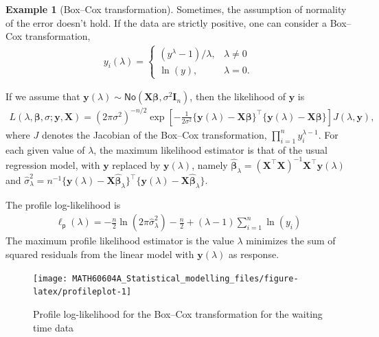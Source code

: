 \documentclass[
  11pt,
  letterpaper,
]{book}
\theoremstyle{definition}
\theoremstyle{definition}
\newtheorem{example}{Example}[chapter]
\theoremstyle{definition}
\theoremstyle{remark}
\begin{document}
\begin{example}[Box--Cox transformation]
\protect\hypertarget{exm:boxcox}{}{\label{exm:boxcox} {} }Sometimes, the assumption of normality of the error doesn't hold. If the data are strictly positive, one can consider a Box--Cox transformation,
\begin{align*}
y_i(\lambda)= \begin{cases}
(y^{\lambda}-1)/\lambda, & \lambda \neq 0\\
\ln(y), & \lambda=0.
\end{cases}
\end{align*}

If we assume that \(\boldsymbol{y}(\lambda) \sim \mathsf{No}(\mathbf{X}\boldsymbol{\beta}, \sigma^2 \mathbf{I}_n)\), then the likelihood of \(\boldsymbol{y}\) is
\begin{align*}
L(\lambda, \boldsymbol{\beta}, \sigma; \boldsymbol{y}, \mathbf{X}) = (2\pi\sigma^2)^{-n/2}\exp \left[ - \frac{1}{2\sigma^2}\{\boldsymbol{y}(\lambda) - \mathbf{X}\boldsymbol{\beta}\}^\top\{\boldsymbol{y}(\lambda) - \mathbf{X}\boldsymbol{\beta}\}\right] J(\lambda, \boldsymbol{y}),
\end{align*}
where \(J\) denotes the Jacobian of the Box--Cox transformation, \(\prod_{i=1}^n y_i^{\lambda-1}\).
For each given value of \(\lambda\), the maximum likelihood estimator is that of the usual regression model, with \(\boldsymbol{y}\) replaced by \(\boldsymbol{y}(\lambda)\), namely \(\widehat{\boldsymbol{\beta}}_\lambda = (\mathbf{X}^\top\mathbf{X})^{-1}\mathbf{X}^\top \boldsymbol{y}(\lambda)\) and \(\widehat{\sigma}^2_\lambda = n^{-1}\{ \boldsymbol{y}(\lambda) - \mathbf{X}\widehat{\boldsymbol{\beta}}_\lambda\}^\top\{ \boldsymbol{y}(\lambda) - \mathbf{X}\widehat{\boldsymbol{\beta}}_\lambda\}\).

The profile log-likelihood is
\begin{align*}
\ell_{\mathsf{p}}(\lambda) = -\frac{n}{2}\ln(2\pi \widehat{\sigma}^2_\lambda) - \frac{n}{2} + (\lambda - 1)\sum_{i=1}^n \ln(y_i)
\end{align*}
The maximum profile likelihood estimator is the value \(\lambda\) minimizes the sum of squared residuals from the linear model with \(\boldsymbol{y}(\lambda)\) as response.
\end{example}

\begin{figure}

{\centering \texttt{[image: MATH60604A\_Statistical\_modelling\_files/figure-latex/profileplot-1]} 

}

\caption{Profile log-likelihood for the Box--Cox transformation for the waiting time data}\label{fig:profileplot}
\end{figure}
\end{document}
